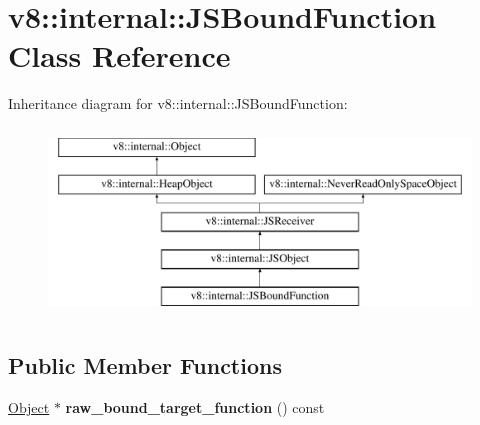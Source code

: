 \hypertarget{classv8_1_1internal_1_1JSBoundFunction}{}\section{v8\+:\+:internal\+:\+:J\+S\+Bound\+Function Class Reference}
\label{classv8_1_1internal_1_1JSBoundFunction}
Inheritance diagram for v8\+:\+:internal\+:\+:J\+S\+Bound\+Function\+:\begin{figure}[H]
\begin{center}
\leavevmode
\includegraphics[height=5.000000cm]{classv8_1_1internal_1_1JSBoundFunction}
\end{center}
\end{figure}
\subsection*{Public Member Functions}
\begin{DoxyCompactItemize}
\item 
\mbox{\label{classv8_1_1internal_1_1JSBoundFunction_a9d2ecf7c72a7fc553d8f3901c9da75ce}} 
\mbox{\hyperlink{classv8_1_1internal_1_1Object}{Object}} $\ast$ {\bfseries raw\+\_\+bound\+\_\+target\+\_\+function} () const
\end{DoxyCompactItemize}
